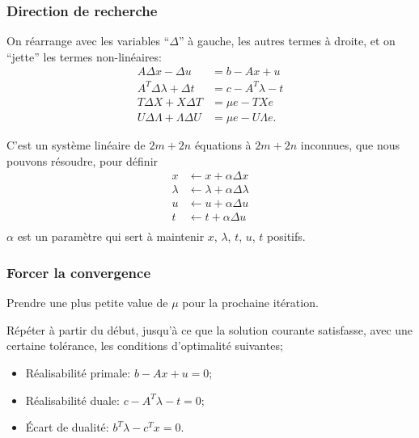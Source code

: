 \documentclass[t,usepdftitle=false]{beamer}
\begin{document}
\begin{frame}
\frametitle{Direction de recherche}

On réarrange avec les variables ``$\Delta$'' à gauche, les autres termes à droite, et on ``jette'' les termes non-linéaires:
\begin{align*}
A\Delta x - \Delta u &= b - Ax + u\\
A^T\Delta \lambda + \Delta t &= c - A^T\lambda - t \\
T\Delta X + X \Delta T &= \mu e - TXe \\
U\Delta \Lambda + \Lambda \Delta U  &= \mu e - U\Lambda e.
\end{align*}

\mbox{}

C'est un système linéaire de $2m + 2n$ équations à $2m + 2n$ inconnues, que nous pouvons résoudre, pour définir
\begin{align*}
x &\leftarrow x + \alpha \Delta x \\
\lambda &\leftarrow \lambda + \alpha \Delta \lambda \\
u &\leftarrow u + \alpha \Delta u \\
t &\leftarrow t + \alpha \Delta u \\
\end{align*}
$\alpha$ est un paramètre qui sert à maintenir $x$, $\lambda$, $t$, $u$, $t$ positifs.

\end{frame}

\begin{frame}
\frametitle{Forcer la convergence}

Prendre une plus petite value de $\mu$ pour la prochaine itération.

\mbox{}

Répéter à partir du début, jusqu'à ce que la solution courante satisfasse, avec une certaine tolérance, les conditions d'optimalité suivantes;
\begin{itemize}
\item
Réalisabilité primale: $b - Ax + u = 0$;
\item
Réalisabilité duale: $c - A^T\lambda - t = 0$;
\item
Écart de dualité: $b^T \lambda - c^Tx = 0$.
\end{itemize}

\mbox{}

\end{frame}
\end{document}
